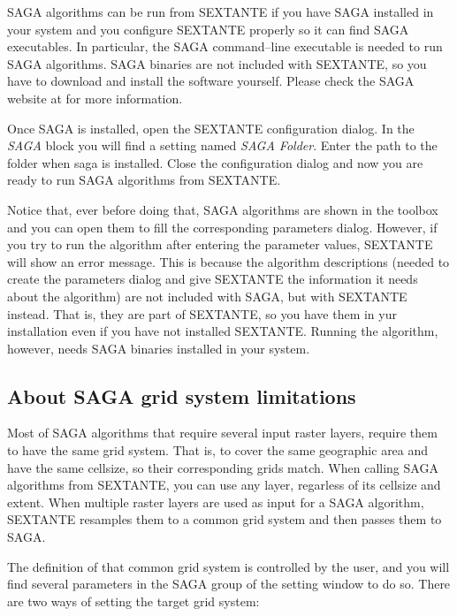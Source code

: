 SAGA algorithms can be run from SEXTANTE if you have SAGA installed in your system and you configure SEXTANTE properly so it can find SAGA executables. In particular, the SAGA command--line executable is needed to run SAGA algorithms. SAGA binaries are not included with SEXTANTE, so you have to download and install the software yourself. Please check the SAGA website at \texttt{} for more information.

Once SAGA is installed, open the SEXTANTE configuration dialog. In the \emph{SAGA} block you will find a setting named \emph{SAGA Folder}. Enter the path to the folder when saga is installed. Close the configuration dialog and now you are ready to run SAGA algorithms from SEXTANTE.

Notice that, ever before doing that, SAGA algorithms are shown in the toolbox and you can open them to fill the corresponding parameters dialog. However, if you try to run the algorithm after entering the parameter values, SEXTANTE will show an error message. This is because the algorithm descriptions (needed to create the parameters dialog and give SEXTANTE the information it needs about the algorithm) are not included with SAGA, but with SEXTANTE instead. That is, they are part of SEXTANTE, so you have them in yur installation even if you have not installed SEXTANTE. Running the algorithm, however, needs SAGA binaries installed in your system.

\subsection{About SAGA grid system limitations}

Most of SAGA algorithms that require several input raster layers, require them to have the same grid system. That is, to cover the same geographic area and have the same cellsize, so their corresponding grids match. When calling SAGA algorithms from SEXTANTE, you can use any layer, regarless of its cellsize and extent. When multiple raster layers are used as input for a SAGA algorithm, SEXTANTE resamples them to a common grid system and then passes them to SAGA.

The definition of that common grid system is controlled by the user, and you will find several parameters in the SAGA group of the setting window to do so. There are two ways of setting the target grid system:

